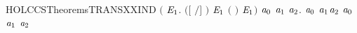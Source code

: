 \begin{SaveVerbatim}{HOLCCSTheoremsTRANSXXIND}
       \ensuremath{(}\HOLSymConst{\HOLTokenForall{}}   \ensuremath{\HOLBoundVar{E}\sb{\mathrm{1}}}.  \ensuremath{(}\ensuremath{[}  \ensuremath{/}\ensuremath{]} \ensuremath{)}  \ensuremath{\HOLBoundVar{E}\sb{\mathrm{1}}} \HOLSymConst{\HOLTokenImp{}}  \ensuremath{(}  \ensuremath{)}  \ensuremath{\HOLBoundVar{E}\sb{\mathrm{1}}}\ensuremath{)} \HOLSymConst{\HOLTokenImp{}}
       \HOLSymConst{\HOLTokenForall{}}\ensuremath{\HOLBoundVar{a}\sb{\mathrm{0}}} \ensuremath{\HOLBoundVar{a}\sb{\mathrm{1}}} \ensuremath{\HOLBoundVar{a}\sb{\mathrm{2}}}. \ensuremath{\HOLBoundVar{a}\sb{\mathrm{0}}} \HOLTokenTransBegin\ensuremath{\HOLBoundVar{a}\sb{\mathrm{1}}}\HOLTokenTransEnd \ensuremath{\HOLBoundVar{a}\sb{\mathrm{2}}} \HOLSymConst{\HOLTokenImp{}}  \ensuremath{\HOLBoundVar{a}\sb{\mathrm{0}}} \ensuremath{\HOLBoundVar{a}\sb{\mathrm{1}}} \ensuremath{\HOLBoundVar{a}\sb{\mathrm{2}}}
\end{SaveVerbatim}
\newcommand{\HOLCCSTheoremsTRANSXXIND}{\UseVerbatim{HOLCCSTheoremsTRANSXXIND}}
